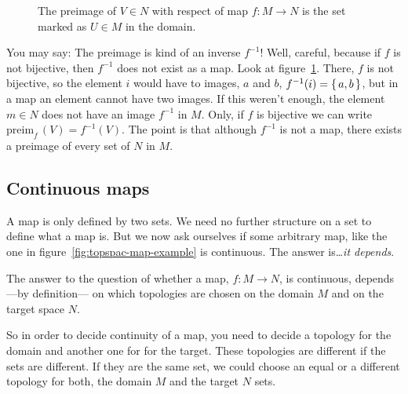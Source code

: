 \begin{figure}[ht]
    \caption{The preimage of $V\in N$ with respect of map $f:M\rightarrow N$ is
      the set marked as $U\in M$ in the domain.}
    \label{fig:topspac-preimagefV}
  \end{figure}

  You may say: The preimage is kind of an inverse $f^{-1}$!
  Well, careful, because if $f$ is not bijective, then $f^{-1}$ does not exist
  as a map. Look at figure~\ref{fig:topspac-preimagefV}. There, $f$ is not
  bijective, so the element $i$ would have to images, $a$ and $b$,
  $f^{-1}(i) = \set{a, b}$, but in a map an element cannot have two images.
  If this weren't enough, the element $m\in N$ does not have an image $f^{-1}$
  in $M$. Only, if $f$ is bijective we can write
  $\text{preim}_f\,(V) = f^{-1}(V)$.
  The point is that although $f^{-1}$ is not a map, there exists a preimage of
  every set of $N$ in $M$.
  
  \subsection{Continuous maps}
  A map is only defined by two sets. We need no further structure on a set to
  define what a map is.
  But we now ask ourselves if some arbitrary map, like the one in
  figure~\ref{fig:topspac-map-example} is continuous.
  The answer is\dots \emph{it depends}.

  The answer to the question of whether a map,
    $f: M\longrightarrow N$,
  is continuous, depends ---by definition--- on which topologies are chosen on
  the domain $M$ and on the target space $N$.

  So in order to decide continuity of a map, you need to decide a topology for
  the domain and another one for for the target. These topologies are different
  if the sets are different. If they are the same set, we could choose an equal
  or a different topology for both, the domain $M$ and the target $N$ sets.

